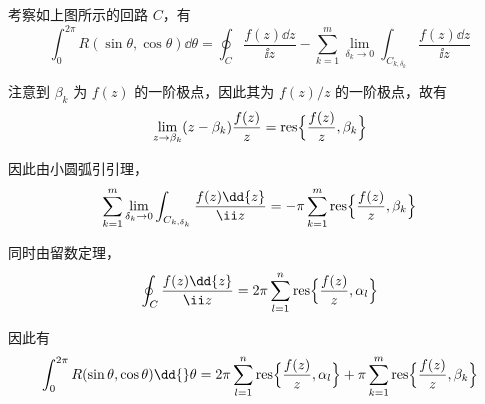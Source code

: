 \begin{question}
\begin{solution}
考察如上图所示的回路 \(C\)，有
\[
\int_0^{2\pi} R(\sin\theta,\cos\theta)\dd{}\theta=\oint_C \frac{f(z)\dd{z}}{\ii z}-\sum_{k=1}^{m}\lim_{\delta_k\to0}\int_{C_{k,\delta_k}}\frac{f(z)\dd{z}}{\ii z}
\]

注意到 \(\beta_k\) 为 \(f(z)\) 的一阶极点，因此其为 \(f(z)/z\) 的一阶极点，故有
\[
\lim_{z\to\beta_k}(z-\beta_k)\frac{f(z)}{z}= \operatorname{res}\Bigl\{\frac{f(z)}{z},\beta_k\Bigr\}
\]

因此由小圆弧引引理，
\[
\sum_{k=1}^{m}\lim_{\delta_k\to0}\int_{C_{k,\delta_k}}\frac{f(z)\dd{z}}{\ii z}=-\pi\sum_{k=1}^{m}\operatorname{res}\Bigl\{\frac{f(z)}{z},\beta_k\Bigr\}
\]

同时由留数定理，
\[
\oint_C \frac{f(z)\dd{z}}{\ii z}=2\pi\sum_{l=1}^{n}\operatorname{res}\Bigl\{\frac{f(z)}{z},\alpha_l\Bigr\}
\]

因此有
\[
\int_0^{2\pi} R(\sin\theta,\cos\theta)\dd{}\theta = 2\pi\sum_{l=1}^{n}\operatorname{res}\Bigl\{\frac{f(z)}{z},\alpha_l\Bigr\} + \pi\sum_{k=1}^{m}\operatorname{res}\Bigl\{\frac{f(z)}{z},\beta_k\Bigr\}
\]
\end{solution}
\end{question}

